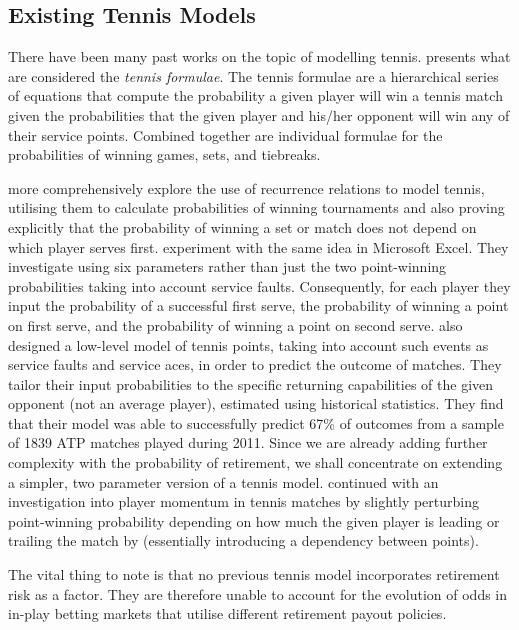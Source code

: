 \documentclass[letterpaper,12pt]{article}
\begin{document}
\subsection{Existing Tennis Models}

There have been many past works on the topic of modelling tennis.  \cite{omalley} presents what are considered the \textit{tennis formulae}.  The tennis formulae are a hierarchical series of equations that compute the probability a given player will win a tennis match given the probabilities that the given player and his/her opponent will win any of their service points.  Combined together are individual formulae for the probabilities of winning games, sets, and tiebreaks.

\cite{servefirst} more comprehensively explore the use of recurrence relations to model tennis, utilising them to calculate probabilities of winning tournaments and also proving explicitly that the probability of winning a set or match does not depend on which player serves first.  \cite{excel} experiment with the same idea in Microsoft Excel.  They investigate using six parameters rather than just the two point-winning probabilities taking into account service faults.  Consequently, for each player they input the probability of a successful first serve, the probability of winning a point on first serve, and the probability of winning a point on second serve.  \cite{willyk} also designed a low-level model of tennis points, taking into account such events as service faults and service aces, in order to predict the outcome of matches.  They tailor their input probabilities to the specific returning capabilities of the given opponent (not an average player), estimated using historical statistics.  They find that their model was able to successfully predict 67\% of outcomes from a sample of 1839 ATP matches played during 2011.  Since we are already adding further complexity with the probability of retirement, we shall concentrate on extending a simpler, two parameter version of a tennis model.  \cite{momentum} continued with an investigation into player momentum in tennis matches by slightly perturbing point-winning probability depending on how much the given player is leading or trailing the match by (essentially introducing a dependency between points).

The vital thing to note is that no previous tennis model incorporates retirement risk as a factor.  They are therefore unable to account for the evolution of odds in in-play betting markets that utilise different retirement payout policies.
\end{document}

